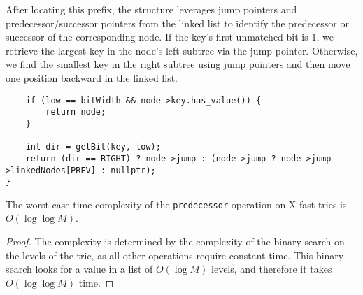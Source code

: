 After locating this prefix, the structure leverages jump pointers and predecessor/successor pointers from the linked list to identify the predecessor or successor of the corresponding node. If the key's first unmatched bit is \(1\), we retrieve the largest key in the node’s left subtree via the jump pointer. Otherwise, we find the smallest key in the right subtree using jump pointers and then move one position backward in the linked list.

\begin{verbatim}
    if (low == bitWidth && node->key.has_value()) {
        return node;
    }

    int dir = getBit(key, low);
    return (dir == RIGHT) ? node->jump : (node->jump ? node->jump->linkedNodes[PREV] : nullptr);
}
\end{verbatim}

\begin{lemma}
The worst-case time complexity of the \texttt{predecessor} operation on X-fast tries is \( O(\log \log M) \).
\end{lemma}

\begin{proof}
The complexity is determined by the complexity of the binary search on the levels of the trie, as all other operations require constant time. This binary search looks for a value in a list of \( O(\log M) \) levels, and therefore it takes \( O(\log \log M) \) time.
\end{proof}
